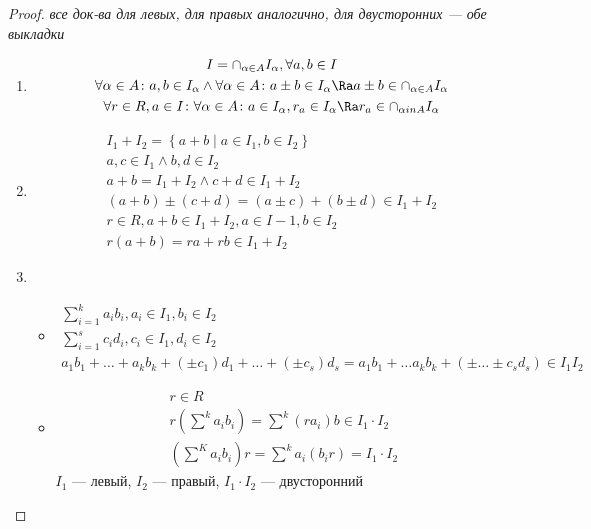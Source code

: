 \begin{proof}
	\textit{все док-ва для левых, для правых аналогично, для двусторонних --- обе выкладки}
	\begin{enumerate}
	\item 	\begin{gather*}
			 I = \cap_{\alpha \in A} I_\alpha, \forall a, b \in I \\
			 \forall \alpha \in A \colon a, b \in I_\alpha \wedge \forall \alpha \in A \colon a \pm b \in I_\alpha \Ra a \pm b \in \cap_{\alpha \in A}I_\alpha \\
			 \forall r \in R, a \in I \colon \forall \alpha \in A \colon a \in I_\alpha, r_a \in I_\alpha \Ra r_a \in \cap_{\alpha in A} I_\alpha
		 \end{gather*}
	\item	\begin{gather*}
			 I_1 + I_2 = \left\lbrace a + b \mid a \in I_1, b \in I_2 \right\rbrace \\
			a, c \in I_1 \wedge b, d \in I_2 \\
			a + b = I_1 + I_2 \wedge c + d \in I_1 + I_2 \\
			(a + b) \pm (c + d) = (a \pm c) + (b \pm d) \in I_1 + I_2 \\
			r \in R, a + b \in I_1 + I_2,  a \in I-1, b \in I_2 \\
			r(a + b) = ra + rb \in I_1 + I_2
		\end{gather*}
	\item \begin{itemize}
		\item \begin{gather*}
			\sum_{i = 1}^k a_i b_i, a_i \in I_1, b_i \in I_2 \\
			\sum_{i = 1}^s c_i d_i, c_i \in I_1, d_i \in I_2 \\
			a_1 b_1 + \dots + a_k b_k + (\pm c_1)d_1 + \dots + (\pm c_s)d_s = a_1 b_1 + \dots a_k b_k + (\pm \dots \pm c_s d_s) \in I_1 I_2
		\end{gather*}
		\item \begin{gather*}
			r \in R \\
			r(\sum^k a_i b_i) = \sum^k (ra_i)b \in I_1 \cdot I_2 \\
			(\sum^K a_i b_i)r = \sum^k a_i(b_ir) = I_1 \cdot I_2
		\end{gather*}
		$I_1$ --- левый, $I_2$ --- правый, $I_1 \cdot I_2$ --- двусторонний
		\end{itemize}
	\end{enumerate}
\end{proof}

